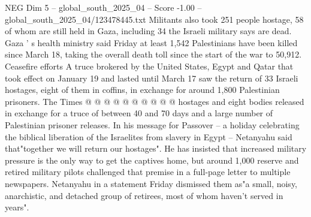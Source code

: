 \begin{textsample}{NEG Dim 5 – global\_south\_2025\_04 – Score -1.00 – global\_south\_2025\_04/123478445.txt}
Militants also took 251 people hostage, 58 of whom are still held in Gaza, including 34 the Israeli military says are dead.
Gaza ' s health ministry said Friday at least 1,542 Palestinians have been killed since March 18, taking the overall death toll since the start of the war to 50,912.
Ceasefire efforts A truce brokered by the United States, Egypt and Qatar that took effect on January 19 and lasted until March 17 saw the return of 33 Israeli hostages, eight of them in coffins, in exchange for around 1,800 Palestinian prisoners.
The Times @ @ @ @ @ @ @ @ @ @ hostages and eight bodies released in exchange for a truce of between 40 and 70 days and a large number of Palestinian prisoner releases.
In his message for Passover -- a holiday celebrating the biblical liberation of the Israelites from slavery in Egypt -- Netanyahu said that"together we will return our hostages".
He has insisted that increased military pressure is the only way to get the captives home, but around 1,000 reserve and retired military pilots challenged that premise in a full-page letter to multiple newspapers.
Netanyahu in a statement Friday dismissed them as"a small, noisy, anarchistic, and detached group of retirees, most of whom haven't served in years".

\end{textsample}
